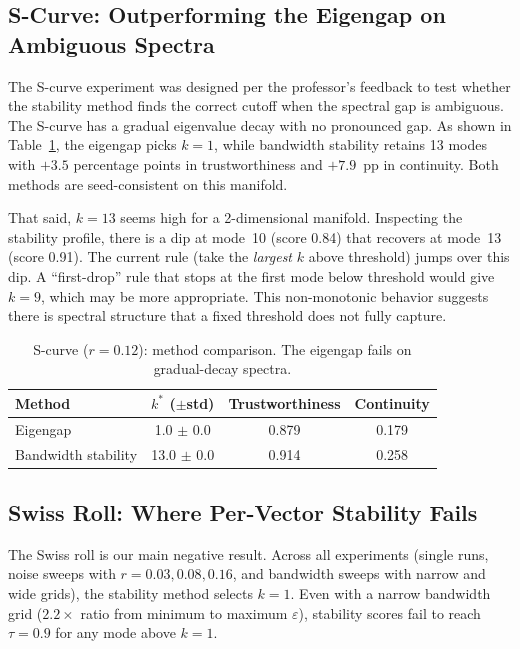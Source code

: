 \documentclass{article}
\begin{document}
\subsection{S-Curve: Outperforming the Eigengap on Ambiguous Spectra}

The S-curve experiment was designed per the professor's feedback to test whether the stability method finds the correct cutoff when the spectral gap is ambiguous. The S-curve has a gradual eigenvalue decay with no pronounced gap. As shown in Table~\ref{tab:scurve_results}, the eigengap picks $k = 1$, while bandwidth stability retains 13 modes with $+3.5$ percentage points in trustworthiness and $+7.9$~pp in continuity. Both methods are seed-consistent on this manifold.

That said, $k = 13$ seems high for a 2-dimensional manifold. Inspecting the stability profile, there is a dip at mode~10 (score 0.84) that recovers at mode~13 (score 0.91). The current rule (take the \emph{largest} $k$ above threshold) jumps over this dip. A ``first-drop'' rule that stops at the first mode below threshold would give $k = 9$, which may be more appropriate. This non-monotonic behavior suggests there is spectral structure that a fixed threshold does not fully capture.

\begin{table}[htbp]
\caption{S-curve ($r = 0.12$): method comparison. The eigengap fails on gradual-decay spectra.}
\label{tab:scurve_results}
\centering
\begin{tabular}{@{}lccc@{}}
\toprule
Method & $k^*$ ($\pm$std) & Trustworthiness & Continuity \\
\midrule
Eigengap & 1.0 $\pm$ 0.0 & 0.879 & 0.179 \\
Bandwidth stability & 13.0 $\pm$ 0.0 & 0.914 & 0.258 \\
\bottomrule
\end{tabular}
\end{table}

\subsection{Swiss Roll: Where Per-Vector Stability Fails}
\label{sec:swiss_roll_failure}

The Swiss roll is our main negative result. Across all experiments (single runs, noise sweeps with $r = 0.03, 0.08, 0.16$, and bandwidth sweeps with narrow and wide grids), the stability method selects $k = 1$. Even with a narrow bandwidth grid ($2.2\times$ ratio from minimum to maximum $\varepsilon$), stability scores fail to reach $\tau = 0.9$ for any mode above $k = 1$.
\end{document}
